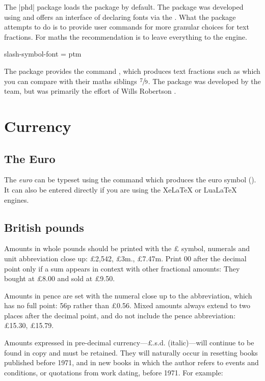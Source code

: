 The |phd| package loads the package  by default. The package was developed using  and offers an interface of declaring fonts via the \cmd{\DeclareInstance}. What the package attempts to do is to provide user commands for more granular choices for text fractions. For maths the recommendation is to leave everything to the \tex engine.

{slash-symbol-font = ptm}

The package provides the command \cmd{\sfrac}, which produces text fractions such as  which you can compare with their maths siblings $\sfrac{7}{9}$. The package was developed by the \latex team, but was primarily the effort of Wills Robertson \citep{xfrac}. 

\section{Currency}

\subsection{The Euro}
The \textit{euro} can be typeset using the command \cmd{\texteuro} which produces the euro symbol (\texteuro). It can also be entered directly if you are using the XeLaTeX or LuaLaTeX engines. 

\subsection{British pounds}
Amounts in whole pounds should be printed with the £ symbol, numerals
and unit abbreviation close up: £2,542, £3m., £7.47m. Print 00
after the decimal point only if a sum appears in context with other
fractional amounts: They bought at £8.00 and sold at £9.50.

Amounts in pence are set with the numeral close up to the abbreviation,
which has no full point: 56p rather than £0.56. Mixed amounts
always extend to two places after the decimal point, and do not include
the pence abbreviation: £15.30, £15.79.

Amounts expressed in pre-decimal currency---£.s.d. (italic)---will
continue to be found in copy and must be retained. They will naturally occur in resetting books published before 1971, and in new books in
which the author refers to events and conditions, or quotations from
work dating, before 1971. For example:


